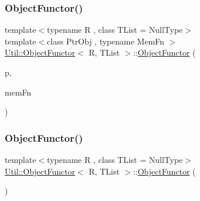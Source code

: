\subsubsection{\texorpdfstring{ObjectFunctor()}{ObjectFunctor()}\hspace{0.1cm}{\footnotesize\ttfamily [5/10]}}
{\footnotesize\ttfamily template$<$typename R , class T\+List  = Null\+Type$>$ \\
template$<$class Ptr\+Obj , typename Mem\+Fn $>$ \\
\mbox{\hyperlink{classUtil_1_1ObjectFunctor}{Util\+::\+Object\+Functor}}$<$ R, T\+List $>$\+::\mbox{\hyperlink{classUtil_1_1ObjectFunctor}{Object\+Functor}} (\begin{DoxyParamCaption}\item[{const Ptr\+Obj \&}]{p,  }\item[{Mem\+Fn}]{mem\+Fn }\end{DoxyParamCaption})\hspace{0.3cm}{\ttfamily [inline]}}

\mbox{\label{classUtil_1_1ObjectFunctor_ac08a0820c0cf21a61abb6da3ede541d4}} 
\subsubsection{\texorpdfstring{ObjectFunctor()}{ObjectFunctor()}\hspace{0.1cm}{\footnotesize\ttfamily [6/10]}}
{\footnotesize\ttfamily template$<$typename R , class T\+List  = Null\+Type$>$ \\
\mbox{\hyperlink{classUtil_1_1ObjectFunctor}{Util\+::\+Object\+Functor}}$<$ R, T\+List $>$\+::\mbox{\hyperlink{classUtil_1_1ObjectFunctor}{Object\+Functor}} (\begin{DoxyParamCaption}{ }\end{DoxyParamCaption})\hspace{0.3cm}{\ttfamily [inline]}}

\mbox{\label{classUtil_1_1ObjectFunctor_a2d42842ec3d69b317aaaafd65cd9e2fd}} 

